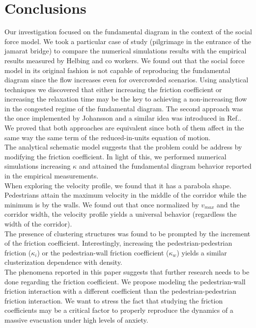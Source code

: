 \section{\label{conclusions}Conclusions}

Our investigation focused on the fundamental diagram in the context of the social force model. We took a particular case of study (pilgrimage in the entrance of the jamarat bridge) to compare the numerical simulations results with the empirical results measured by Helbing and co workers. We found out that the  social force model in its original fashion is not capable of reproducing the fundamental diagram since the flow increases even for overcrowded scenarios. Using analytical techniques we discovered that either increasing the friction coefficient or increasing the relaxation time may be the key to achieving a non-increasing flow in the congested regime of the fundamental diagram. The second approach was the once implemented by Johansson and a similar idea was introduced in Ref.\cite{parisi2}. We proved that both approaches are equivalent since both of them affect in the same way the same term of the reduced-in-units equation of motion.\\

The analytical schematic model suggests that the problem could be address by modifying the friction coefficient. In light of this, we performed numerical simulations increasing $\kappa$ and attained the fundamental diagram behavior reported in the empirical measurements. \\

When exploring the velocity profile, we found that it has a parabola shape. Pedestrians attain the maximum velocity in the middle of the corridor while the minimum is by the walls. We found out that once normalized by $v_{max}$ and the corridor width, the velocity profile yields a universal behavior (regardless the width of the corridor).\\

The presence of clustering structures was found to be prompted by the increment of the friction coefficient. Interestingly, increasing the pedestrian-pedestrian friction ($\kappa_i$) or the pedestrian-wall friction coefficient ($\kappa_w$) yields a similar clusterization dependence with density.\\

The phenomena reported in this paper suggests that further research needs to be done regarding the friction coefficient. We propose modeling the pedestrian-wall friction interaction with a different coefficient than the pedestrian-pedestrian friction interaction. We want to stress the fact that studying the friction coefficients may be a critical factor to properly reproduce the dynamics of a massive evacuation under high levels of anxiety. 



